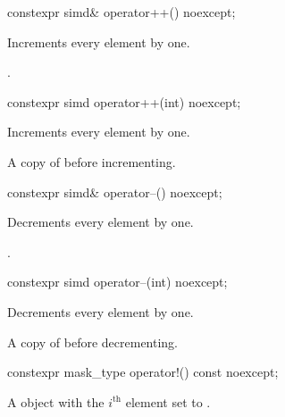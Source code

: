 \begin{itemdecl}
constexpr simd& operator++() noexcept;
\end{itemdecl}

\begin{itemdescr}
  \pnum{}

  \pnum\effects
  Increments every element by one.

  \pnum\returns
  .
\end{itemdescr}

\begin{itemdecl}
constexpr simd operator++(int) noexcept;
\end{itemdecl}

\begin{itemdescr}
  \pnum{}

  \pnum\effects
  Increments every element by one.

  \pnum\returns
  A copy of  before incrementing.
\end{itemdescr}

\begin{itemdecl}
constexpr simd& operator--() noexcept;
\end{itemdecl}

\begin{itemdescr}
  \pnum{}

  \pnum\effects
  Decrements every element by one.

  \pnum\returns
  .
\end{itemdescr}

\begin{itemdecl}
constexpr simd operator--(int) noexcept;
\end{itemdecl}

\begin{itemdescr}
  \pnum{}

  \pnum\effects
  Decrements every element by one.

  \pnum\returns
  A copy of  before decrementing.
\end{itemdescr}

\begin{itemdecl}
constexpr mask_type operator!() const noexcept;
\end{itemdecl}

\begin{itemdescr}
  \pnum{}

  \pnum\returns
  A  object with the $i^\text{th}$ element set to  \foralli.
\end{itemdescr}

